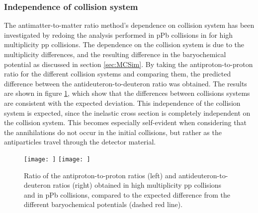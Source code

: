 \subsubsection{Independence of collision system}
The antimatter-to-matter ratio method's dependence on collision system has been investigated by redoing the analysis performed in pPb collisions in \cite{dbarIvan} for high multiplicity pp collisions. The dependence on the collision system is due to the multiplicity differences, and the resulting difference in the baryochemical potential as discussed in section \ref{sec:MCSim}. By taking the antiproton-to-proton ratio for the different collision systems and comparing them, the predicted difference between the antideuteron-to-deuteron ratio was obtained. The results are shown in figure \ref{fig:pp_pPb_dbardRatio}, which show that the differences between collisions systems are consistent with the expected deviation. This independence of the collision system is expected, since the inelastic cross section is completely independent on the collision system. This becomes especially self-evident when considering that the annihilations do not occur in the initial collisions, but rather as the antiparticles travel through the detector material.

\begin{figure}[h]
    \centering
    \texttt{[image: ]}
    \texttt{[image: ]}
    \caption{Ratio of the antiproton-to-proton ratios (left) and antideuteron-to-deuteron ratios (right) obtained in high multiplicity pp collisions and in pPb collisions, compared to the expected difference from the different baryochemical potentials (dashed red line).}
    \label{fig:pp_pPb_dbardRatio}
\end{figure}

